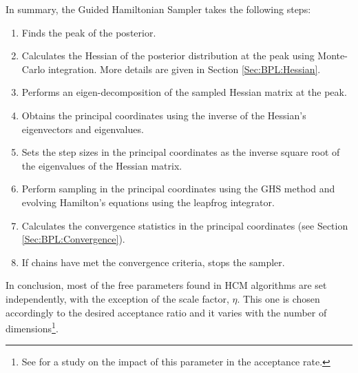 \qquad In summary, the Guided Hamiltonian Sampler takes the following steps:
\begin{enumerate}
\item Finds the peak of the posterior.
\item Calculates the Hessian of the posterior distribution at the peak using Monte-Carlo integration. More details are given in Section \ref{Sec:BPL:Hessian}.
\item Performs an eigen-decomposition of the sampled Hessian matrix at the peak.
\item Obtains the principal coordinates using the inverse of the Hessian's eigenvectors and eigenvalues.
\item Sets the step sizes in the principal coordinates as the inverse square root of the eigenvalues of the Hessian matrix.
\item Perform sampling in the principal coordinates using the GHS method and evolving Hamilton's equations using the leapfrog integrator.
\item Calculates the convergence statistics in the principal coordinates (see Section \ref{Sec:BPL:Convergence}).
\item If chains have met the convergence criteria, stops the sampler.
\end{enumerate}

In conclusion, most of the free parameters found in HCM algorithms are set independently, with the exception of the scale factor, $\eta$. This one is chosen accordingly to the desired acceptance ratio and it varies with the number of dimensions\footnote{See \citealt{SreeThesis} for a study on the impact of this parameter in the acceptance rate.}.

